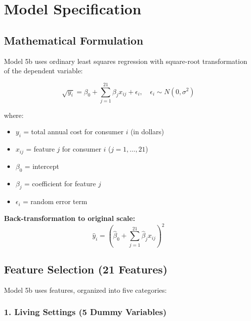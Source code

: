 \section{Model Specification}

\subsection{Mathematical Formulation}

Model 5b uses ordinary least squares regression with square-root transformation of the dependent variable:

\begin{equation}\label{eq:model5b}
\sqrt{y_i} = \beta_0 + \sum_{j=1}^{21} \beta_j x_{ij} + \epsilon_i, \quad \epsilon_i \sim N(0, \sigma^2)
\end{equation}

where:
\begin{itemize}
    \item $y_i$ = total annual cost for consumer $i$ (in dollars)
    \item $x_{ij}$ = feature $j$ for consumer $i$ ($j = 1, \ldots, 21$)
    \item $\beta_0$ = intercept
    \item $\beta_j$ = coefficient for feature $j$
    \item $\epsilon_i$ = random error term
\end{itemize}

\textbf{Back-transformation to original scale:}
\begin{equation}
\hat{y}_i = \left(\hat{\beta}_0 + \sum_{j=1}^{21} \hat{\beta}_j x_{ij}\right)^2
\end{equation}

\subsection{Feature Selection (21 Features)}

Model 5b uses  \ModelOneNumFeatures{} features, organized into five categories:

\subsubsection{1. Living Settings (5 Dummy Variables)}

